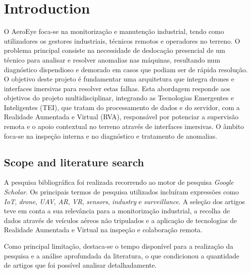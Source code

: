 \documentclass[conference,a4paper]{IEEEtran}
\begin{document}
\section{Introduction}
O AeroEye foca-se na monitorização e manutenção industrial, tendo como utilizadores os gestores industriais, técnicos remotos e operadores no terreno. O problema principal consiste na necessidade de deslocação presencial de um técnico para analisar e resolver anomalias nas máquinas, resultando num diagnóstico dispendioso e demorado em casos que podiam ser de rápida resolução.\\
O objetivo deste projeto é fundamentar uma arquitetura que integra drones e interfaces imersivas para resolver estas falhas. Esta abordagem responde aos objetivos do projeto multidisciplinar, integrando as Tecnologias Emergentes e Inteligentes (TEI), que tratam do processamento de dados e do servidor, com a Realidade Aumentada e Virtual (RVA), responsável por potenciar a supervisão remota e o apoio contextual no terreno através de interfaces imersivas. O âmbito foca-se na inspeção interna e no diagnóstico e tratamento de anomalias.\\

\subsection{Scope and literature search}

A pesquisa bibliográfica foi realizada recorrendo ao motor de pesquisa \textit{Google Scholar}. Os principais termos de pesquisa utilizados incluíram expressões como \textit{IoT}, \textit{drone}, \textit{UAV}, \textit{AR}, \textit{VR}, \textit{sensors}, \textit{industry} e \textit{surveillance}. A seleção dos artigos teve em conta a sua relevância para a monitorização industrial, a recolha de dados através de veículos aéreos não tripulados e a aplicação de tecnologias de Realidade Aumentada e Virtual na inspeção e colaboração remota.

Como principal limitação, destaca-se o tempo disponível para a realização da pesquisa e a análise aprofundada da literatura, o que condicionou a quantidade de artigos que foi possível analisar detalhadamente.
\end{document}
